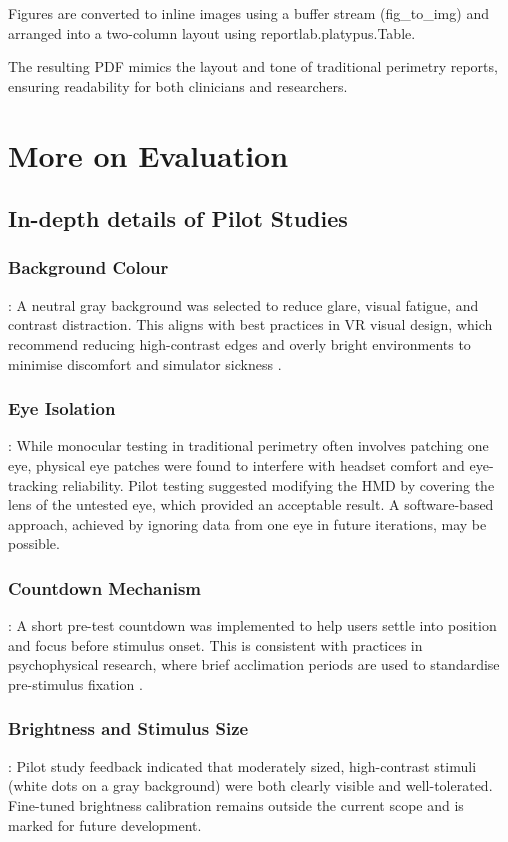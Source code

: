 \documentclass{l4proj}
\begin{document}
\begin{appendices}
Figures are converted to inline images using a buffer stream (fig\_to\_img) and arranged into a two-column layout using reportlab.platypus.Table. 

The resulting PDF mimics the layout and tone of traditional perimetry reports, ensuring readability for both clinicians and researchers.


\newpage
\section{More on Evaluation}
\subsection{In-depth details of Pilot Studies}
\label{sec:PilotStudiesDetails}

\subsubsection{Background Colour}:
A neutral gray background was selected to reduce glare, visual fatigue, and contrast distraction. This aligns with best practices in VR visual design, which recommend reducing high-contrast edges and overly bright environments to minimise discomfort and simulator sickness \citep{eval1}.

\subsubsection{Eye Isolation}:
While monocular testing in traditional perimetry often involves patching one eye, physical eye patches were found to interfere with headset comfort and eye-tracking reliability. Pilot testing suggested modifying the HMD by covering the lens of the untested eye, which provided an acceptable result. A software-based approach, achieved by ignoring data from one eye in future iterations, may be possible.

\subsubsection{Countdown Mechanism}:
A short pre-test countdown was implemented to help users settle into position and focus before stimulus onset. This is consistent with practices in psychophysical research, where brief acclimation periods are used to standardise pre-stimulus fixation \citep{eval2}.

\subsubsection{Brightness and Stimulus Size}:
Pilot study feedback indicated that moderately sized, high-contrast stimuli (white dots on a gray background) were both clearly visible and well-tolerated. Fine-tuned brightness calibration remains outside the current scope and is marked for future development.


\end{appendices}
\end{document}
